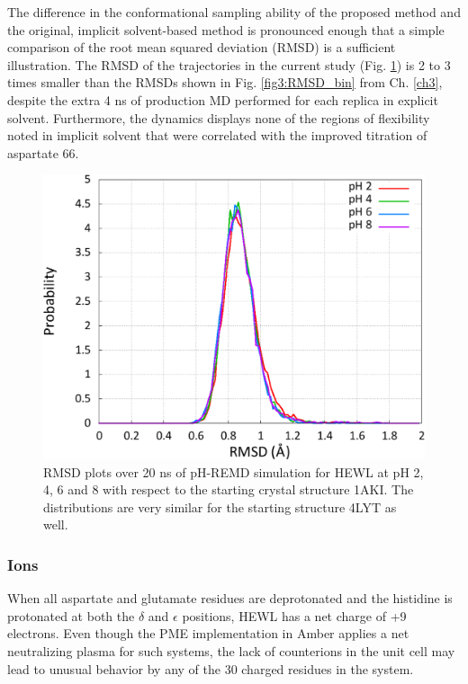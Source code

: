 The difference in the conformational sampling ability of the proposed method and
the original, implicit solvent-based method is pronounced enough that a simple
comparison of the root mean squared deviation (RMSD) is a sufficient
illustration. The RMSD of the trajectories in the current study (Fig.
\ref{fig4:hewl_rmsd}) is 2 to 3 times smaller than the RMSDs shown in Fig.
\ref{fig3:RMSD_bin} from Ch. \ref{ch3}, despite the extra 4 ns of production MD
performed for each replica in explicit solvent. Furthermore, the dynamics
displays none of the regions of flexibility noted in implicit solvent that were
correlated with the improved titration of aspartate 66.
\cite{Swails_JChemTheoryComput_2012_v8_p4393}

\begin{figure}
   \includegraphics[width=6.5in]{1AKI_RMSDs.eps}
   \caption{RMSD plots over 20 ns of pH-REMD simulation for HEWL at pH 2, 4, 6
            and 8 with respect to the starting crystal structure 1AKI. The
            distributions are very similar for the starting structure 4LYT as
            well.}
   \label{fig4:hewl_rmsd}
\end{figure}

\subsubsection*{Ions}

When all aspartate and glutamate residues are deprotonated and the histidine is
protonated at both the $\delta$ and $\epsilon$ positions, HEWL has a net charge
of +9 electrons. Even though the PME implementation in Amber applies a net
neutralizing plasma for such systems, the lack of counterions in the unit cell
may lead to unusual behavior by any of the 30 charged residues in the system.

